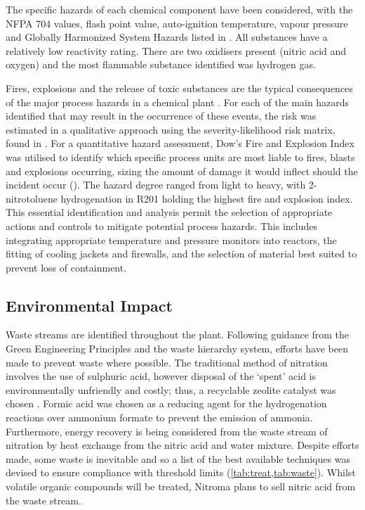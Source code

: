 The specific hazards of each chemical component have been considered, with the NFPA 704 values, flash point value, auto-ignition temperature, vapour pressure and Globally Harmonized System Hazards listed in . All substances have a relatively low reactivity rating. There are two oxidisers present (nitric acid and oxygen) and the most flammable substance identified was hydrogen gas.  

Fires, explosions and the release of toxic substances are the typical consequences of the major process hazards in a chemical plant \cite{mannan_lees_2012}. For each of the main hazards identified that may result in the occurrence of these events, the risk was estimated in a qualitative approach using the severity-likelihood risk matrix, found in . For a quantitative hazard assessment, Dow's Fire and Explosion Index was utilised to identify which specific process units are most liable to fires, blasts and explosions occurring, sizing the amount of damage it would inflect should the incident occur (). The hazard degree ranged from light to heavy, with 2-nitrotoluene hydrogenation in R201 holding the highest fire and explosion index. This essential identification and analysis permit the selection of appropriate actions and controls to mitigate potential process hazards. This includes integrating appropriate temperature and pressure monitors into reactors, the fitting of cooling jackets and firewalls, and the selection of material best suited to prevent loss of containment.


\subsection{Environmental Impact}
Waste streams are identified throughout the plant. Following guidance from the Green Engineering Principles and the waste hierarchy system, efforts have been made to prevent waste where possible. The traditional method of nitration involves the use of sulphuric acid, however disposal of the ‘spent’ acid is environmentally unfriendly and costly; thus, a recyclable zeolite catalyst was chosen \cite{smith_superior_1996}.  Formic acid was chosen as a reducing agent for the hydrogenation reactions over ammonium formate to prevent the emission of ammonia. Furthermore, energy recovery is being considered from the waste stream of nitration by heat exchange from the nitric acid and water mixture. 
Despite efforts made, some waste is inevitable and so a list of the best available techniques was devised to ensure compliance with threshold limits (\cref{tab:treat,tab:waste}). Whilst volatile organic compounds will be treated, Nitroma plans to sell nitric acid from the waste stream. 
